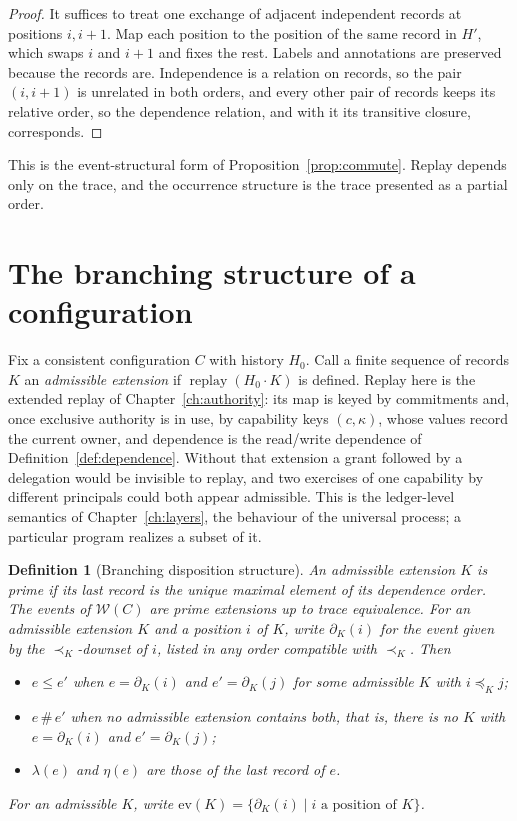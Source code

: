\documentclass[11pt,openany]{book}
\newtheorem{definition}[theorem]{Definition}
\theoremstyle{remark}
\newcommand{\replay}{\operatorname{replay}}
\begin{document}
\begin{proof}
It suffices to treat one exchange of adjacent independent records at
positions $i,i+1$. Map each position to the position of the same record
in $H'$, which swaps $i$ and $i+1$ and fixes the rest. Labels and
annotations are preserved because the records are. Independence is a
relation on records, so the pair $(i,i+1)$ is unrelated in both orders,
and every other pair of records keeps its relative order, so the
dependence relation, and with it its transitive closure, corresponds.
\end{proof}

This is the event-structural form of Proposition~\ref{prop:commute}. Replay
depends only on the trace, and the occurrence structure is the trace
presented as a partial order.

\section{The branching structure of a configuration}

Fix a consistent configuration $C$ with history $H_0$. Call a finite
sequence of records $K$ an \emph{admissible extension} if
$\replay(H_0\cdot K)$ is defined. Replay here is the extended replay of
Chapter~\ref{ch:authority}: its map is keyed by commitments and, once
exclusive authority is in use, by capability keys $(c,\kappa)$, whose
values record the current owner, and dependence is the read/write
dependence of Definition~\ref{def:dependence}. Without that extension a
grant followed by a delegation would be invisible to replay, and two
exercises of one capability by different principals could both appear
admissible. This is the ledger-level semantics of
Chapter~\ref{ch:layers}, the behaviour of the universal process; a
particular program realizes a subset of it.

\begin{definition}[Branching disposition structure]\label{def:wc}
An admissible extension $K$ is \emph{prime} if its last record is the
unique maximal element of its dependence order. The events of
$\mathcal W(C)$ are prime extensions up to trace equivalence. For an
admissible extension $K$ and a position $i$ of $K$, write $\partial_K(i)$
for the event given by the $\prec_K$-downset of $i$, listed in any order
compatible with $\prec_K$. Then
\begin{itemize}[leftmargin=1.5em]
\item $e\le e'$ when $e=\partial_K(i)$ and $e'=\partial_K(j)$ for some
admissible $K$ with $i\preceq_K j$;
\item $e\,\#\,e'$ when no admissible extension contains both, that is,
there is no $K$ with $e=\partial_K(i)$ and $e'=\partial_K(j)$;
\item $\lambda(e)$ and $\eta(e)$ are those of the last record of $e$.
\end{itemize}
For an admissible $K$, write $\mathrm{ev}(K)=\{\partial_K(i)\mid i\text{ a
position of }K\}$.
\end{definition}
\end{document}
